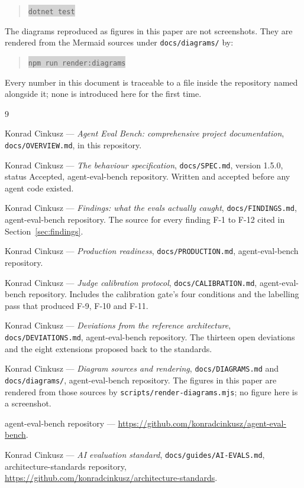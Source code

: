 \documentclass[11pt,a4paper]{article}
\newcommand{\repopath}[1]{\colorbox{lightgray}{\texttt{#1}}}
\begin{document}
\begin{quote}
\repopath{dotnet test}
\end{quote}

\noindent The diagrams reproduced as figures in this paper are not screenshots.
They are rendered from the Mermaid sources under \texttt{docs/diagrams/} by:

\begin{quote}
\repopath{npm run render:diagrams}
\end{quote}

\noindent Every number in this document is traceable to a file inside the
repository named alongside it; none is introduced here for the first time.

\begin{thebibliography}{9}

Konrad Cinkusz --- \textit{Agent Eval Bench: comprehensive project
documentation}, \texttt{docs/OVERVIEW.md}, in this repository.

Konrad Cinkusz --- \textit{The behaviour specification}, \texttt{docs/SPEC.md},
version 1.5.0, status Accepted, agent-eval-bench repository. Written and
accepted before any agent code existed.

Konrad Cinkusz --- \textit{Findings: what the evals actually caught},
\texttt{docs/FINDINGS.md}, agent-eval-bench repository. The source for every
finding F-1 to F-12 cited in Section~\ref{sec:findings}.

Konrad Cinkusz --- \textit{Production readiness}, \texttt{docs/PRODUCTION.md},
agent-eval-bench repository.

Konrad Cinkusz --- \textit{Judge calibration protocol},
\texttt{docs/CALIBRATION.md}, agent-eval-bench repository. Includes the
calibration gate's four conditions and the labelling pass that produced F-9,
F-10 and F-11.

Konrad Cinkusz --- \textit{Deviations from the reference architecture},
\texttt{docs/DEVIATIONS.md}, agent-eval-bench repository. The thirteen open
deviations and the eight extensions proposed back to the standards.

Konrad Cinkusz --- \textit{Diagram sources and rendering},
\texttt{docs/DIAGRAMS.md} and \texttt{docs/diagrams/}, agent-eval-bench
repository. The figures in this paper are rendered from those sources by
\texttt{scripts/render-diagrams.mjs}; no figure here is a screenshot.

agent-eval-bench repository ---
\url{https://github.com/konradcinkusz/agent-eval-bench}.

Konrad Cinkusz --- \textit{AI evaluation standard},
\texttt{docs/guides/AI-EVALS.md}, architecture-standards repository,
\url{https://github.com/konradcinkusz/architecture-standards}.

\end{thebibliography}
\end{document}
